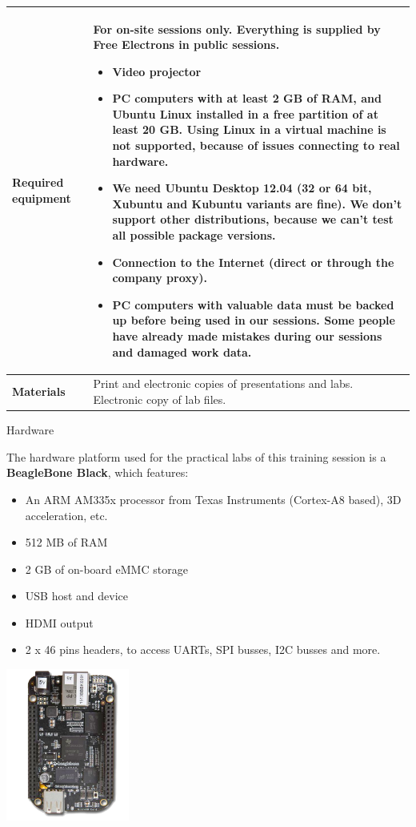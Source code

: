 \documentclass[a4paper,12pt,obeyspaces,spaces,hyphens]{article}
\begin{document}
{\begin{tabularx}{\textwidth}{|g|h|}
    {\bf Required equipment} &
    {\bf For on-site sessions only.}
    \newline Everything is supplied by Free Electrons in public
    sessions.
    \begin{itemize}
    \item Video projector
    \item PC computers with at least 2 GB of RAM, and Ubuntu Linux
    installed in a {\bf free partition of at least 20 GB. Using Linux
      in a virtual machine is not supported}, because of issues
    connecting to real hardware.
    \item We need Ubuntu Desktop 12.04 (32 or 64 bit, Xubuntu and
    Kubuntu variants are fine). We don't support other
    distributions, because we can't test all possible package versions.
    \item {\bf Connection to the Internet} (direct or through the
    company proxy).
    \item {\bf PC computers with valuable data must be backed up}
    before being used in our sessions.  Some people have already made
    mistakes during our sessions and damaged work data.
    \end{itemize} \\
    \hline

    {\bf Materials} & Print and electronic copies of presentations and
    labs.
    \newline Electronic copy of lab files.\\
    \hline

\end{tabularx}}

\feagendatwocolumn
{Hardware}
{
  The hardware platform used for the practical labs of this training
  session is a {\bf BeagleBone Black}, which features:

  \begin{itemize}
  \item An ARM AM335x processor from Texas Instruments (Cortex-A8
    based), 3D acceleration, etc.
  \item 512 MB of RAM
  \item 2 GB of on-board eMMC storage
  \item USB host and device
  \item HDMI output
  \item 2 x 46 pins headers, to access UARTs, SPI busses, I2C busses
    and more.
  \end{itemize}
}
{}
{
  \begin{center}
    \includegraphics[height=5cm]{agenda/beagleboneblack.png}
  \end{center}
}
\end{document}

